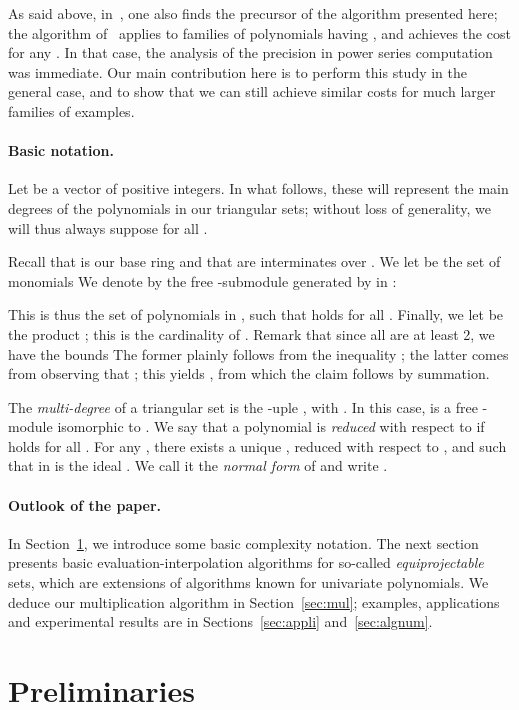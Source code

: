 \documentclass[amsthm]{elsart}
\theoremstyle{plain}
\begin{document}
As said above, in~\cite{LiMoSc07}, one also finds the precursor of the
algorithm presented here; the algorithm of~\cite{LiMoSc07} applies to
families of polynomials having , and achieves the
cost  for any . In that
case, the analysis of the precision in power series computation was
immediate. Our main contribution here is to perform this study in the
general case, and to show that we can still achieve similar costs for
much larger families of examples.

\paragraph*{Basic notation.}
Let  be a vector of positive integers. In what
follows, these will represent the main degrees of the polynomials in
our triangular sets; without loss of generality, we will thus always
suppose  for all . 

Recall that  is our base ring and that  are
interminates over . We let  be the set of monomials
 We
denote by  the free -submodule generated by 
in :

This is thus the set of polynomials  in , 
such that  holds for all .
Finally, we let  be the product ;
this is the cardinality of . Remark that since all  are at
least 2, we have the bounds
 The former plainly follows from the inequality ; the latter comes from observing that ; this yields , from which the claim follows by summation.

The {\em multi-degree} of a triangular set  is the
-uple , with . In this case,  is a
free -module isomorphic to .  We say that a
polynomial  is {\em reduced} with respect
to  if  holds for all . For any , there exists a unique , reduced with respect to , and such that
 in is the ideal . We call it the {\em normal
  form} of  and write .


\paragraph*{Outlook of the paper.} In Section~\ref{sec:prel}, we
introduce some basic complexity notation. The next section presents
basic evaluation-interpolation algorithms for so-called {\em
  equiprojectable} sets, which are extensions of algorithms known for
univariate polynomials. We deduce our multiplication algorithm in
Section~\ref{sec:mul}; examples, applications and experimental results
are in Sections~\ref{sec:appli} and~\ref{sec:algnum}.




\section{Preliminaries}\label{sec:prel}
\end{document}
